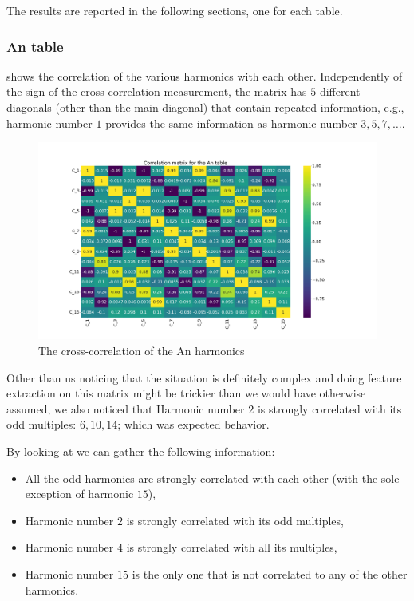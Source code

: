 The results are reported in the following sections, one for each table.

\subsubsection{An table}
 shows the correlation of the various harmonics with each other. Independently
of the sign of the cross-correlation measurement, the matrix has $5$ different diagonals (other than
the main diagonal) that contain repeated information, e.g., harmonic number $1$ provides the same
information as harmonic number $3, 5, 7, \ldots$.
\begin{figure}
	\centering
	\includegraphics[scale=.2]{img/An_corr_matrix.png}
	\caption{The cross-correlation of the An harmonics} \label{fig:an-corr}
\end{figure}
Other than us noticing that the situation is definitely complex and doing feature extraction on this
matrix might be trickier than we would have otherwise assumed, we also noticed that Harmonic number
$2$ is strongly correlated with its odd multiples: $6, 10, 14$; which was expected behavior.

By looking at  we can gather the following information:
\begin{itemize}
	\item All the odd harmonics are strongly correlated with each other (with the sole exception
	      of harmonic $15$),
	\item Harmonic number $2$ is strongly correlated with its odd multiples,
	\item Harmonic number $4$ is strongly correlated with all its multiples,
	\item Harmonic number $15$ is the only one that is not correlated to any of the other
	      harmonics.
\end{itemize}

